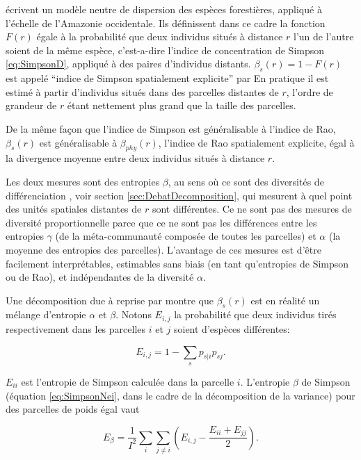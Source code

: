 \documentclass[
  11pt,
  french,
  a4paper,
  extrafontsizes,onecolumn,openright
  ]{memoir}
\begin{document}
\textcite{Chave2002} écrivent un modèle neutre de dispersion des espèces forestières, appliqué à l'échelle de l'Amazonie occidentale\autocite{Condit2002}.
Ils définissent dans ce cadre la fonction \(F(r)\) égale à la probabilité que deux individus situés à distance \(r\) l'un de l'autre soient de la même espèce, c'est-a-dire l'indice de concentration de Simpson \eqref{eq:SimpsonD}, appliqué à des paires d'individus distants.
\(\beta_s(r)=1-F(r)\) est appelé \enquote{indice de Simpson spatialement explicite} par \textcite{Shen2013}
En pratique il est estimé à partir d'individus situés dans des parcelles distantes de \(r\), l'ordre de grandeur de \(r\) étant nettement plus grand que la taille des parcelles.

De la même façon que l'indice de Simpson est généralisable à l'indice de Rao, \(\beta_s(r)\) est généralisable à \(\beta_{phy}(r)\), l'indice de Rao spatialement explicite, égal à la divergence moyenne entre deux individus situés à distance \(r\).

Les deux mesures sont des entropies \(\beta\), au sens où ce sont des diversités de différenciation \autocite{Jurasinski2009}, voir section \ref{sec:DebatDecomposition}, qui mesurent à quel point des unités spatiales distantes de \(r\) sont différentes.
Ce ne sont pas des mesures de diversité proportionnelle parce que ce ne sont pas les différences entre les entropies \(\gamma\) (de la méta-communauté composée de toutes les parcelles) et \(\alpha\) (la moyenne des entropies des parcelles).
L'avantage de ces mesures est d'être facilement interprétables, estimables sans biais (en tant qu'entropies de Simpson ou de Rao), et indépendantes de la diversité \(\alpha\).

Une décomposition due à \textcite{Nei1973} reprise par \textcite{Chave2007} montre que \(\beta_s(r)\) est en réalité un mélange d'entropie \(\alpha\) et \(\beta\).
Notons \(E_{i,j}\) la probabilité que deux individus tirés respectivement dans les parcelles \(i\) et \(j\) soient d'espèces différentes:

\begin{equation}
  \label{eq:Nei1973}
  E_{i,j} = 1-\sum_{s}{p_{s|i}}{p_{sj}}.
\end{equation}

\(E_{ii}\) est l'entropie de Simpson calculée dans la parcelle \(i\).
L'entropie \(\beta\) de Simpson (équation \eqref{eq:SimpsonNei}, dans le cadre de la décomposition de la variance) pour des parcelles de poids égal vaut

\begin{equation}
  \label{eq:EbetaNei}
  E_{\beta} = \frac{1}{I^2} \sum_{i}\sum_{j\ne i}\left({E_{i,j}-\frac{E_{ii}+E_{jj}}{2}}\right).
\end{equation}
\end{document}
